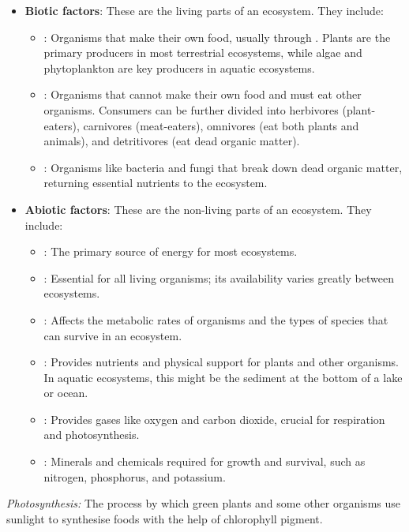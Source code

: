 \begin{itemize}
    \item \textbf{Biotic factors}: These are the living parts of an ecosystem. They include:
    \begin{itemize}
        \item {}: Organisms that make their own food, usually through .  Plants are the primary producers in most terrestrial ecosystems, while algae and phytoplankton are key producers in aquatic ecosystems.
        \item {}: Organisms that cannot make their own food and must eat other organisms. Consumers can be further divided into herbivores (plant-eaters), carnivores (meat-eaters), omnivores (eat both plants and animals), and detritivores (eat dead organic matter).
        \item {}: Organisms like bacteria and fungi that break down dead organic matter, returning essential nutrients to the ecosystem.
    \end{itemize}
    \item \textbf{Abiotic factors}: These are the non-living parts of an ecosystem. They include:
    \begin{itemize}
        \item {}: The primary source of energy for most ecosystems.
        \item {}: Essential for all living organisms; its availability varies greatly between ecosystems.
        \item {}: Affects the metabolic rates of organisms and the types of species that can survive in an ecosystem.
        \item {}: Provides nutrients and physical support for plants and other organisms. In aquatic ecosystems, this might be the sediment at the bottom of a lake or ocean.
        \item {}: Provides gases like oxygen and carbon dioxide, crucial for respiration and photosynthesis.
        \item {}: Minerals and chemicals required for growth and survival, such as nitrogen, phosphorus, and potassium.
    \end{itemize}
\end{itemize}

\begin{marginnote}
\textit{Photosynthesis:} The process by which green plants and some other organisms use sunlight to synthesise foods with the help of chlorophyll pigment.  
\end{marginnote}

